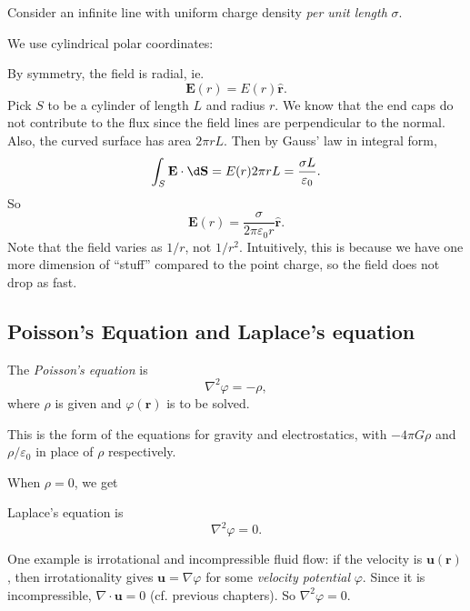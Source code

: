 \documentclass[a4paper]{article}
\begin{document}
\begin{eg}
  Consider an infinite line with uniform charge density \emph{per unit length} $\sigma$.

  We use cylindrical polar coordinates:
  \begin{center}
  \end{center}
  By symmetry, the field is radial, ie.
  \[
    \mathbf{E}(r) = E(r) \hat{\mathbf{r}}.
  \]
  Pick $S$ to be a cylinder of length $L$ and radius $r$. We know that the end caps do not contribute to the flux since the field lines are perpendicular to the normal. Also, the curved surface has area $2\pi r L$. Then by Gauss' law in integral form,
  \[
    \int_S\mathbf{E}\cdot \d \mathbf{S} = E(r)2\pi rL = \frac{\sigma L}{\varepsilon_0}.
  \]
  So
  \[
    \mathbf{E}(r) = \frac{\sigma}{2\pi \varepsilon_0 r} \hat{\mathbf{r}}.
  \]
  Note that the field varies as $1/r$, not $1/r^2$. Intuitively, this is because we have one more dimension of ``stuff'' compared to the point charge, so the field does not drop as fast.
\end{eg}

\subsection{Poisson's Equation and Laplace's equation}
\begin{defi}
  The \emph{Poisson's equation} is
  \[
    \nabla^2 \varphi = -\rho,
  \]
  where $\rho$ is given and $\varphi(\mathbf{r})$ is to be solved.
\end{defi}
This is the form of  the equations for gravity and electrostatics, with $-4\pi G \rho$ and $\rho/\varepsilon_0$ in place of $\rho$ respectively.

When $\rho = 0$, we get
\begin{defi}
  Laplace's equation is
  \[
    \nabla^2 \varphi = 0.
  \]
\end{defi}
One example is irrotational and incompressible fluid flow: if the velocity is $\mathbf{u}(\mathbf{r})$,  then irrotationality gives $\mathbf{u} = \nabla \varphi$ for some \emph{velocity potential} $\varphi$. Since it is incompressible, $\nabla\cdot \mathbf{u} = 0$ (cf. previous chapters). So $\nabla^2 \varphi = 0$.
\end{document}
